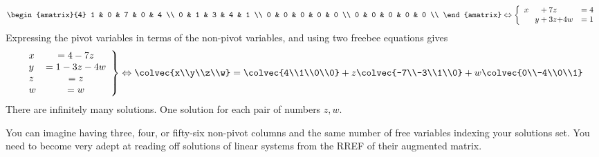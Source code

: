 \begin{example}
 \begin{eqnarray*}
 \begin{amatrix}{4} 
1 & 0 & 7 & 0 & 4 \\ 
0 & 1 & 3 & 4 & 1 \\ 
0 & 0 & 0 & 0 & 0 \\ 
0 & 0 & 0 & 0 & 0 \\ 
\end{amatrix}
\Leftrightarrow
\left\{
\begin{array}{lcr}
	x \phantom{+y}    + 7z  \phantom{+w} & = 4 \\
	\phantom {x+}   y + 3z  {+4w} & = 1 \\
     \end{array}
     \right.
\end{eqnarray*}  
Expressing the pivot variables in terms of the non-pivot variables, and using two freebee equations gives
\begin{eqnarray*}
\left.
\begin{array}{lcr}
	x & = 4 -7z \\
	 y  & = 1 -3z-4w\\
	 z         & = z\\
	w & =w          
     \end{array}
     \right\}
     \Leftrightarrow
\colvec{x\\y\\z\\w} = \colvec{4\\1\\0\\0} + z\colvec{-7\\-3\\1\\0} + w\colvec{0\\-4\\0\\1}
\end{eqnarray*}
There are infinitely many solutions. One solution for each pair of numbers $z,w$. 
\end{example}
You can imagine having three, four, or fifty-six non-pivot columns and the same number of free variables indexing your solutions set. You need to become very adept at reading off solutions of linear systems from the RREF
of their augmented matrix. 


